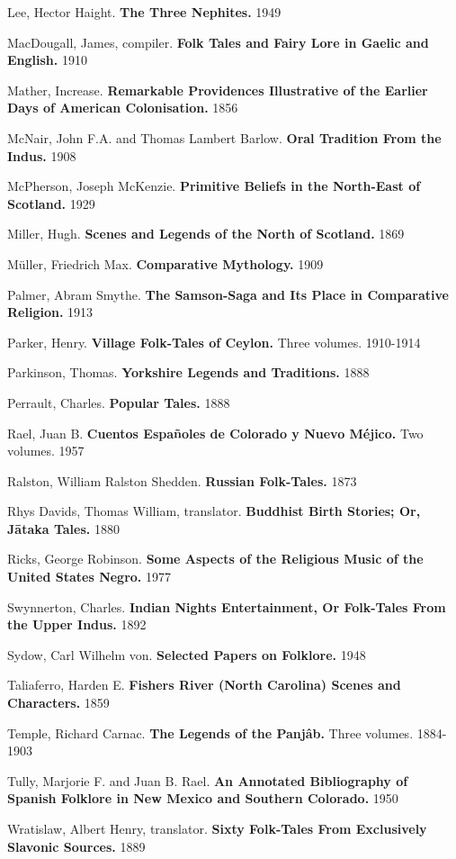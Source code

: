 \documentclass[14pt,a4paper]{memoir}
\begin{document}
Lee, Hector Haight. \textbf{The Three Nephites.} 1949

MacDougall, James, compiler. \textbf{Folk Tales and Fairy Lore in Gaelic
and English.} 1910

Mather, Increase. \textbf{Remarkable Providences Illustrative of the
Earlier Days of American Colonisation.} 1856

McNair, John F.A. and Thomas Lambert Barlow. \textbf{Oral Tradition From
the Indus.} 1908

McPherson, Joseph McKenzie. \textbf{Primitive Beliefs in the North-East
of Scotland.} 1929

Miller, Hugh. \textbf{Scenes and Legends of the North of Scotland.} 1869

Müller, Friedrich Max. \textbf{Comparative Mythology.} 1909

Palmer, Abram Smythe. \textbf{The Samson-Saga and Its Place in
Comparative Religion.} 1913

Parker, Henry. \textbf{Village Folk-Tales of Ceylon.} Three volumes.
1910-1914

Parkinson, Thomas. \textbf{Yorkshire Legends and Traditions.} 1888

Perrault, Charles. \textbf{Popular Tales.} 1888

Rael, Juan B. \textbf{Cuentos Españoles de Colorado y Nuevo Méjico.} Two
volumes. 1957

Ralston, William Ralston Shedden. \textbf{Russian Folk-Tales.} 1873

Rhys Davids, Thomas William, translator. \textbf{Buddhist Birth Stories;
Or, Jātaka Tales.} 1880

Ricks, George Robinson. \textbf{Some Aspects of the Religious Music of
the United States Negro.} 1977

Swynnerton, Charles. \textbf{Indian Nights\textquotesingle{}
Entertainment, Or Folk-Tales From the Upper Indus.} 1892

Sydow, Carl Wilhelm von. \textbf{Selected Papers on Folklore.} 1948

Taliaferro, Harden E. \textbf{Fisher\textquotesingle s River (North
Carolina) Scenes and Characters.} 1859

Temple, Richard Carnac. \textbf{The Legends of the Panjâb.} Three
volumes. 1884-1903

Tully, Marjorie F. and Juan B. Rael. \textbf{An Annotated Bibliography
of Spanish Folklore in New Mexico and Southern Colorado.} 1950

Wratislaw, Albert Henry, translator. \textbf{Sixty Folk-Tales From
Exclusively Slavonic Sources.} 1889
\end{document}
